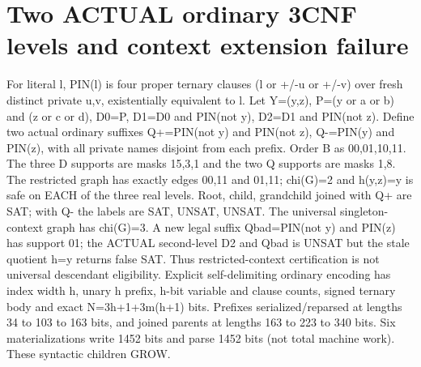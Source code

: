 \documentclass[11pt]{article}
\begin{document}
\section{Two ACTUAL ordinary 3CNF levels and context extension failure}
For literal l, PIN(l) is four proper ternary clauses (l or +/-u or +/-v) over fresh distinct private u,v, existentially equivalent to l. Let Y=(y,z), P=(y or a or b) and (z or c or d), D0=P, D1=D0 and PIN(not y), D2=D1 and PIN(not z). Define two actual ordinary suffixes Q+=PIN(not y) and PIN(not z), Q-=PIN(y) and PIN(z), with all private names disjoint from each prefix.
Order B as 00,01,10,11. The three D supports are masks 15,3,1 and the two Q supports are masks 1,8.
The restricted graph has exactly edges {00,11} and {01,11}; chi(G)=2 and h(y,z)=y is safe on EACH of the three real levels. Root, child, grandchild joined with Q+ are SAT; with Q- the labels are SAT, UNSAT, UNSAT.
The universal singleton-context graph has chi(G)=3. A new legal suffix Qbad=PIN(not y) and PIN(z) has support {01}; the ACTUAL second-level D2 and Qbad is UNSAT but the stale quotient h=y returns false SAT. Thus restricted-context certification is not universal descendant eligibility.
Explicit self-delimiting ordinary encoding has index width h, unary h prefix, h-bit variable and clause counts, signed ternary body and exact N=3h+1+3m(h+1) bits. Prefixes serialized/reparsed at lengths 34 to 103 to 163 bits, and joined parents at lengths 163 to 223 to 340 bits. Six materializations write 1452 bits and parse 1452 bits (not total machine work). These syntactic children GROW.
\end{document}
